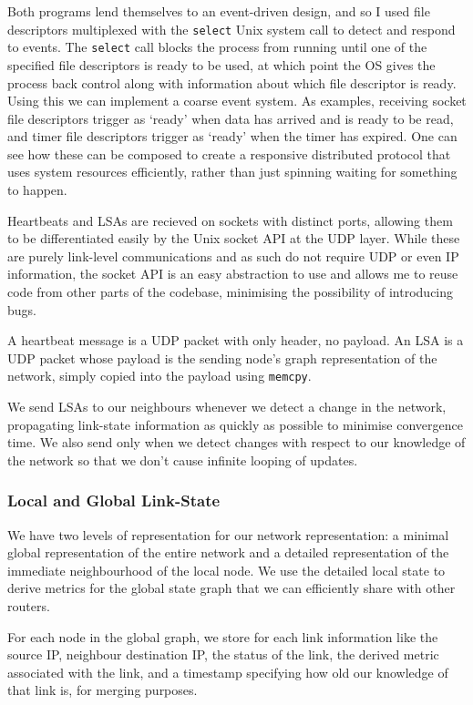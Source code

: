 \documentclass[10pt,twoside,a4paper]{article}
\begin{document}
Both programs lend themselves to an event-driven design, and so I used file descriptors multiplexed with the \texttt{select} Unix system call to detect and respond to events. The \texttt{select} call blocks the process from running until one of the specified file descriptors is ready to be used, at which point the OS gives the process back control along with information about which file descriptor is ready. Using this we can implement a coarse event system. As examples, receiving socket file descriptors trigger as `ready' when data has arrived and is ready to be read, and timer file descriptors trigger as `ready' when the timer has expired. One can see how these can be composed to create a responsive distributed protocol that uses system resources efficiently, rather than just spinning waiting for something to happen.

Heartbeats and LSAs are recieved on sockets with distinct ports, allowing them to be differentiated easily by the Unix socket API at the UDP layer. While these are purely link-level communications and as such do not require UDP or even IP information, the socket API is an easy abstraction to use and allows me to reuse code from other parts of the codebase, minimising the possibility of introducing bugs.

A heartbeat message is a UDP packet with only header, no payload. An LSA is a UDP packet whose payload is the sending node's graph representation of the network, simply copied into the payload using \texttt{memcpy}.

% 
We send LSAs to our neighbours whenever we detect a change in the network, propagating link-state information as quickly as possible to minimise convergence time. We also send only when we detect changes with respect to our knowledge of the network so that we don't cause infinite looping of updates.

\subsubsection{Local and Global Link-State}

We have two levels of representation for our network representation: a minimal global representation of the entire network and a detailed representation of the immediate neighbourhood of the local node. We use the detailed local state to derive metrics for the global state graph that we can efficiently share with other routers.

For each node in the global graph, we store for each link information like the source IP, neighbour destination IP, the status of the link, the derived metric associated with the link, and a timestamp specifying how old our knowledge of that link is, for merging purposes.
\end{document}
